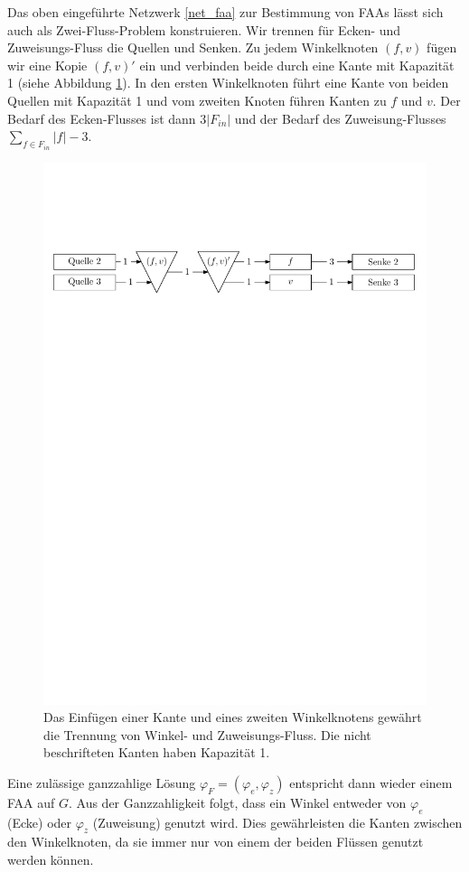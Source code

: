 \begin{remark}

Das oben eingeführte Netzwerk \ref{net_faa} zur Bestimmung von FAAs lässt sich auch als Zwei-Fluss-Problem konstruieren. Wir trennen für Ecken- und Zuweisungs-Fluss die Quellen und Senken.  Zu jedem Winkelknoten $(f,v)$ fügen wir eine Kopie $(f,v)'$ ein und verbinden beide durch eine Kante mit Kapazität 1 (siehe Abbildung \ref{faa_as_2}). In den ersten Winkelknoten führt eine Kante von beiden Quellen mit Kapazität 1 und vom zweiten Knoten führen Kanten zu $f$ und $v$. Der Bedarf des Ecken-Flusses ist dann $3|F_{in}|$ und der Bedarf des Zuweisung-Flusses $\sum_{f \in F_{in}}{|f|-3}$.

\begin{figure}[b]
	\centering
  \includegraphics[width=1\textwidth]{faa_2_flow.pdf}
  \caption{Das Einfügen einer Kante und eines zweiten Winkelknotens gewährt die Trennung von Winkel- und Zuweisungs-Fluss. Die nicht beschrifteten Kanten haben Kapazität 1.}
  \label{faa_as_2}
\end{figure}

Eine zulässige ganzzahlige Lösung $\varphi_F = (\varphi_e,\varphi_z)$ entspricht dann wieder einem FAA auf $G$. Aus der Ganzzahligkeit folgt, dass ein Winkel entweder von $\varphi_{e}$ (Ecke) oder $\varphi_{z}$ (Zuweisung) genutzt wird. Dies gewährleisten die Kanten zwischen den Winkelknoten, da sie immer nur von einem der beiden Flüssen genutzt werden können.
\end{remark}

